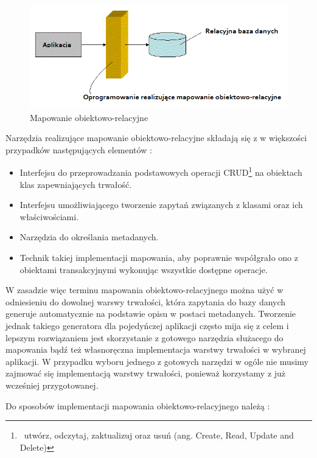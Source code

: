 \documentclass[12pt]{report}
\begin{document}
\begin{figure}[h]
\centering
\includegraphics[width=.9\textwidth]{resources/orm.png}
\caption{Mapowanie obiektowo-relacyjne}
\end{figure}

Narzędzia realizujące mapowanie obiektowo-relacyjne składają się z w wię\-kszości przypadków następujących elementów \cite{hibernate}:

\begin{itemize}
\item Interfejsu do przeprowadzania podstawowych operacji CRUD\footnote{~utwórz, odczytaj, zaktualizuj oraz usuń (ang. Create, Read, Update and Delete)} na obiektach
klas zapewniających trwałość.
\item Interfejsu umożliwiającego tworzenie zapytań związanych z klasami oraz ich właściwościami.
\item Narzędzia do określania metadanych.
\item Technik takiej implementacji mapowania, aby poprawnie współgrało ono z obiektami transakcyjnymi wykonując wszystkie dostępne operacje. 
\end{itemize}

W zasadzie więc terminu mapowania obiektowo-relacyjnego można użyć w odniesieniu do dowolnej warswy trwałości, która zapytania do bazy danych generuje automatycznie
na podstawie opisu w postaci metadanych. Tworzenie jednak takiego generatora dla pojedyńczej aplikacji często mija się z celem i lepszym rozwiązaniem jest skorzystanie z
gotowego narzędzia służacego do mapowania bądź też własnoręczna implementacja warstwy trwałości w wybranej aplikacji. W przypadku wyboru jednego z gotowych narzędzi
w ogóle nie musimy zajmować się implementacją warstwy trwałości, ponieważ korzystamy z już wcześniej przygotowanej.

Do sposobów implementacji mapowania obiektowo-relacyjnego należą \cite{hibernate}:
\end{document}
